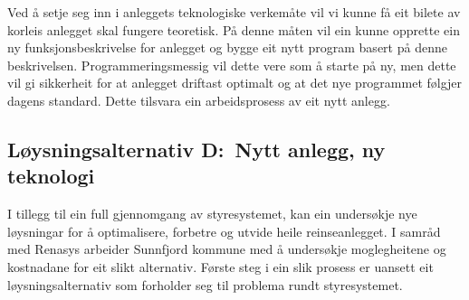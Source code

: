Ved å setje seg inn i anleggets teknologiske verkemåte vil vi kunne få eit bilete av korleis anlegget skal fungere teoretisk.
På denne måten vil ein kunne opprette ein ny funksjonsbeskrivelse for anlegget og bygge eit nytt program basert på denne beskrivelsen.
Programmeringsmessig vil dette vere som å starte på ny, men dette vil gi sikkerheit for at anlegget driftast optimalt og at det nye programmet følgjer
dagens standard. Dette tilsvara ein arbeidsprosess av eit nytt anlegg.

\newpage
\subsection{Løysningsalternativ D:~Nytt anlegg, ny teknologi}
I tillegg til ein full gjennomgang av styresystemet, 
kan ein undersøkje nye løysningar for å optimalisere, forbetre og utvide heile reinseanlegget.
I samråd med Renasys arbeider Sunnfjord kommune med å undersøkje moglegheitene og kostnadane for eit slikt alternativ.
Første steg i ein slik prosess er uansett eit løysningsalternativ som forholder seg til problema rundt styresystemet.


